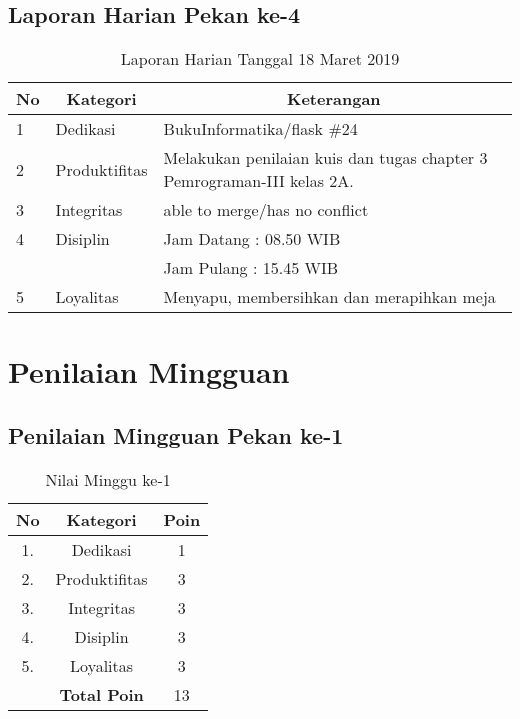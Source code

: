 \subsection{Laporan Harian Pekan ke-4}

\begin{table}[htp]
\caption{Laporan Harian Tanggal 18 Maret 2019}
\label{tab:lh180319}
\begin{tabular}{|l|l|l|}
\hline
\textbf{No} & \multicolumn{1}{c|}{\textbf{Kategori}} & \multicolumn{1}{c|}{\textbf{Keterangan}} \\ \hline
1 & Dedikasi & BukuInformatika/flask \#24 \\ \hline
2 & Produktifitas & Melakukan penilaian kuis dan tugas chapter 3 Pemrograman-III kelas 2A.\\ \hline
3 & Integritas & able to merge/has no conflict \\ \hline
4 & Disiplin & Jam Datang : 08.50 WIB \\
 &  & Jam Pulang : 15.45 WIB \\ \hline
5 & Loyalitas & Menyapu, membersihkan dan merapihkan meja \\ \hline
\end{tabular}
\end{table}

\section{Penilaian Mingguan}

\subsection{Penilaian Mingguan Pekan ke-1}

\begin{table}[htp]
\centering
\caption{Nilai Minggu ke-1}
\label{tab:nm01}
\begin{tabular}{|c|c|c|}
\hline
\textbf{No} & \textbf{Kategori} & \textbf{Poin} \\ \hline
1. & Dedikasi & 1 \\ \hline
2. & Produktifitas & 3 \\ \hline
3. & Integritas & 3 \\ \hline
4. & Disiplin & 3 \\ \hline
5. & Loyalitas & 3 \\ \hline
 & \textbf{Total Poin} & 13 \\ \hline
\end{tabular}
\end{table}

